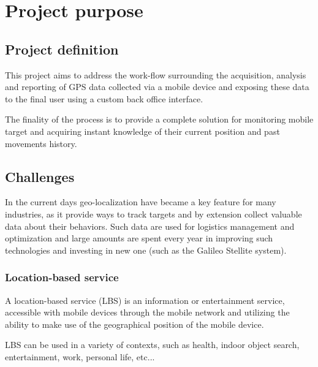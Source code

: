 
\section{Project purpose}
\subsection{Project definition}
This project aims to address the work-flow surrounding the acquisition, analysis and reporting of GPS data collected via a mobile device and exposing these data to the final user using a custom back office interface.

The finality of the process is to provide a complete solution for monitoring mobile target and acquiring instant knowledge of their current position and past movements history.

\subsection{Challenges}
In the current days geo-localization have became a key feature for many industries, as it provide ways to track targets and by extension collect valuable data about their behaviors. Such data are used for logistics management and optimization and large amounts are spent every year in improving such technologies and investing in new one (such as the Galileo Stellite system).

\subsubsection{Location-based service}
A location-based service (LBS) is an information or entertainment service, accessible with mobile devices through the mobile network and utilizing the ability to make use of the geographical position of the mobile device.

LBS can be used in a variety of contexts, such as health, indoor object search, entertainment, work, personal life, etc...\cite{geolocation:wikipidea:geomarketing}

